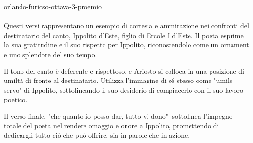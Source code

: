\documentclass[preview]{standalone}
\begin{document}
\begin{snippet}{orlando-furioso-ottava-3-proemio}
    \\\\
    Questi versi rappresentano un esempio di cortesia e
    ammirazione nei confronti del destinatario del canto,
    Ippolito d'Este, figlio di Ercole I d'Este.
    Il poeta esprime la sua gratitudine e il suo rispetto
    per Ippolito, riconoscendolo come un ornament
    e uno splendore del suo tempo.

    Il tono del canto è deferente e rispettoso,
    e Ariosto si colloca in una posizione di umiltà di
    fronte al destinatario.
    Utilizza l'immagine di sé stesso come "umile servo" di Ippolito,
    sottolineando il suo desiderio di compiacerlo con
    il suo lavoro poetico.

    Il verso finale, "che quanto io posso dar, tutto vi dono",
    sottolinea l'impegno totale del poeta nel rendere omaggio
    e onore a Ippolito, promettendo di dedicargli tutto
    ciò che può offrire, sia in parole che in azione.
\end{snippet}
\end{document}
